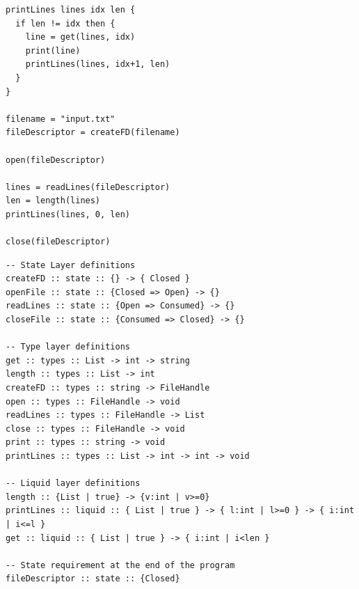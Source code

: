 \documentclass{easychair}
\newcommand{\LayeredTypes}{\textsc{LayeredTypes}}
\begin{document}




\begin{minipage}{0.4\linewidth}
\begin{lstlisting}[caption={Simple example code},label={lst:code_before}]
printLines lines idx len {
  if len != idx then {
    line = get(lines, idx)
    print(line)
    printLines(lines, idx+1, len)
  }
}

filename = "input.txt"
fileDescriptor = createFD(filename)

open(fileDescriptor)

lines = readLines(fileDescriptor)
len = length(lines)
printLines(lines, 0, len)

close(fileDescriptor)
\end{lstlisting}
\end{minipage}%
\begin{minipage}{0.59\linewidth}
\begin{lstlisting}[caption={Annotations for \LayeredTypes},label={lst:code_after}]
-- State Layer definitions
createFD :: state :: {} -> { Closed }
openFile :: state :: {Closed => Open} -> {}
readLines :: state :: {Open => Consumed} -> {}
closeFile :: state :: {Consumed => Closed} -> {}

-- Type layer definitions
get :: types :: List -> int -> string
length :: types :: List -> int
createFD :: types :: string -> FileHandle
open :: types :: FileHandle -> void
readLines :: types :: FileHandle -> List
close :: types :: FileHandle -> void
print :: types :: string -> void
printLines :: types :: List -> int -> int -> void

-- Liquid layer definitions
length :: {List | true} -> {v:int | v>=0}
printLines :: liquid :: { List | true } -> { l:int | l>=0 } -> { i:int | i<=l }
get :: liquid :: { List | true } -> { i:int | i<len }

-- State requirement at the end of the program
fileDescriptor :: state :: {Closed}	
\end{lstlisting}
\end{minipage}
\end{document}
